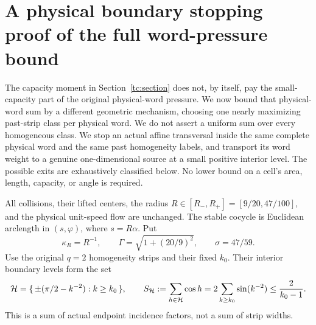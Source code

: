 \section{A physical boundary stopping proof of the full word-pressure bound}
\label{ps:section}

The capacity moment in Section~\ref{tc:section} does not, by itself,
pay the small-capacity part of the original physical-word pressure.
We now bound that physical-word sum by a different geometric
mechanism, choosing one nearly maximizing past-strip class per
physical word.  We do not assert a uniform sum over every
homogeneous class.  We stop an actual affine
transversal inside the same complete physical word and the same
past homogeneity labels, and transport its word weight to a genuine
one-dimensional source at a small positive interior level.  The
possible exits are exhaustively classified below.  No lower bound
on a cell's area, length, capacity, or angle is required.

All collisions, their lifted centers, the radius
$R\in[R_-,R_+]=[9/20,47/100]$, and the physical unit-speed flow are
unchanged.  The stable cocycle is Euclidean arclength in $(s,\varphi)$,
where $s=R\alpha$.  Put
\[
 \kappa_R=R^{-1},\qquad
 \Gamma=\sqrt{1+(20/9)^2},\qquad
 \sigma=47/59.
\]
Use the original $q=2$ homogeneity strips and their fixed $k_0$.
Their interior boundary levels form the set
\[
 \mathcal H=\{\,\pm(\pi/2-k^{-2}):k\ge k_0\,\},\qquad
 S_{\mathcal H}:=\sum_{h\in\mathcal H}\cos h
     =2\sum_{k\ge k_0}\sin(k^{-2})
     \le {2\over k_0-1}.
\]
This is a sum of actual endpoint incidence factors, not a sum of
strip widths.

